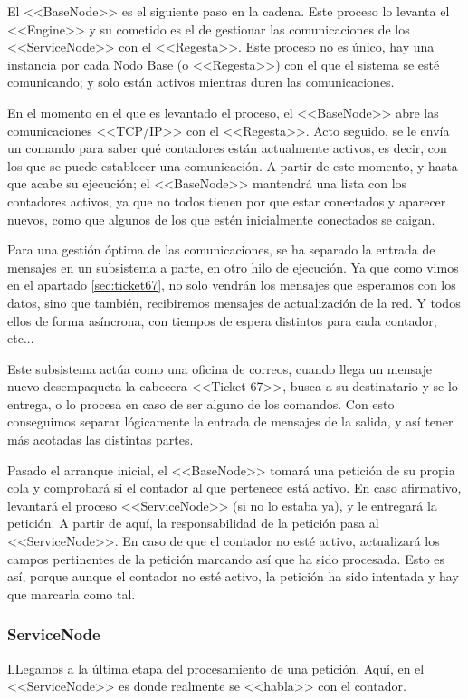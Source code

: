 El <<BaseNode>> es el siguiente paso en la cadena. Este proceso lo levanta el <<Engine>> y su cometido es el de gestionar las comunicaciones de los <<ServiceNode>> con el <<Regesta>>. Este proceso no es único, hay una instancia por cada Nodo Base (o <<Regesta>>) con el que el sistema se esté comunicando; y solo están activos mientras duren las comunicaciones. 

En el momento en el que  es levantado el proceso, el <<BaseNode>> abre las comunicaciones <<TCP/IP>> con el <<Regesta>>. Acto seguido, se le envía un comando para saber qué contadores están actualmente activos, es decir, con los que se puede establecer una comunicación. A partir de este momento, y hasta que acabe su ejecución; el <<BaseNode>> mantendrá una lista con los contadores activos, ya que no todos tienen por que estar conectados y aparecer nuevos, como que algunos de los que estén inicialmente conectados se caigan.

Para una gestión óptima de las comunicaciones, se ha separado la entrada de mensajes en un subsistema a parte, en otro hilo de ejecución. Ya que como vimos en el apartado \ref{sec:ticket67}, no solo vendrán los mensajes que esperamos con los datos, sino que también, recibiremos mensajes de actualización de la red. Y todos ellos de forma asíncrona, con tiempos de espera distintos para cada contador, etc...

Este subsistema actúa como una oficina de correos, cuando llega un mensaje nuevo desempaqueta la cabecera <<Ticket-67>>, busca a su destinatario y se lo entrega, o lo procesa en caso de ser alguno de los comandos. Con esto conseguimos separar lógicamente la entrada de mensajes de la salida, y así tener más acotadas las distintas partes.

Pasado el arranque inicial, el <<BaseNode>> tomará una petición de su propia cola y comprobará si el contador al que pertenece está activo. En caso afirmativo, levantará el proceso <<ServiceNode>> (si no lo estaba ya), y le entregará la petición. A partir de aquí, la responsabilidad de la petición pasa al <<ServiceNode>>. En caso de que el contador no esté activo, actualizará los campos pertinentes de la petición marcando así que ha sido procesada. Esto es así, porque aunque el contador no esté activo, la petición ha sido intentada y hay que marcarla como tal.

\subsubsection{ServiceNode}

LLegamos a la última etapa del procesamiento de una petición. Aquí, en el <<ServiceNode>> es donde realmente se <<habla>> con el contador. 



















